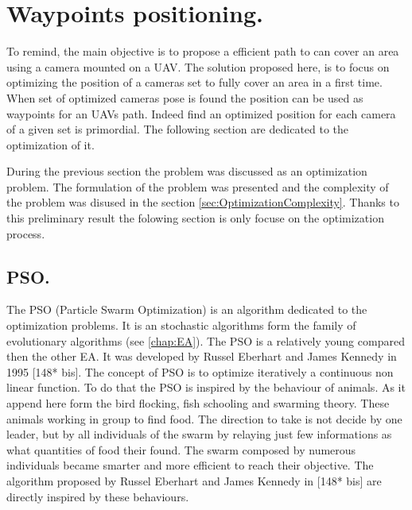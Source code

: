 \chapter{Waypoints positioning.} 
\minitoc
To remind, the main objective is to propose a efficient path to can cover an area using a camera mounted on a UAV. The solution proposed here, is to focus on optimizing the position of a cameras set to fully cover an area in a first time. When set of optimized cameras pose is found the position can be used as waypoints for an UAVs path. Indeed find an optimized position for each camera of a given set is primordial. The following section are dedicated to the optimization of it. 





During the previous section the problem was discussed as an optimization problem. The formulation of the problem was presented  and  the complexity of the problem was disused in the section \ref{sec:OptimizationComplexity}. Thanks to this preliminary result the folowing section is only focuse on the optimization process. 



\section{PSO.}

The PSO (Particle Swarm Optimization) is an algorithm dedicated to the optimization problems. It is an stochastic algorithms form the family of evolutionary algorithms (see \ref{chap:EA}). 
The PSO is a relatively young compared then the other EA. It was developed by Russel Eberhart and James Kennedy in 1995 [148* bis]. The concept of PSO is to optimize iteratively a continuous non linear function. To do that the PSO is inspired by the behaviour of animals. As it append here form the bird flocking, fish schooling and swarming theory. These animals working in group to find food. 
The direction to take is not decide by one leader, but by all individuals of the swarm by relaying just few informations as what quantities of food their found. 
The swarm composed by numerous individuals became smarter and more efficient to reach their objective. 
The algorithm proposed by Russel Eberhart and James Kennedy in [148* bis] are directly inspired by these behaviours.

